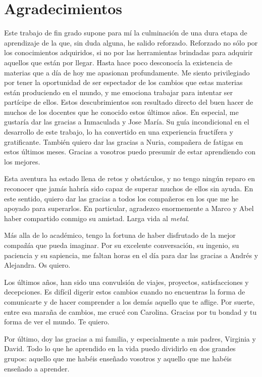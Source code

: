 
\chapter*{Agradecimientos}
Este trabajo de fin grado supone para mí la culminación de una dura etapa de aprendizaje de la que, sin duda alguna, he salido reforzado. Reforzado no sólo por los conocimientos adquiridos, si no por las herramientas brindadas para adquirir aquellos que están por llegar. Hasta hace poco desconocía la existencia de materias que a día de hoy me apasionan profundamente. Me siento privilegiado por tener la oportunidad de ser espectador de los cambios que estas materias están produciendo en el mundo, y me emociona trabajar para intentar ser partícipe de ellos. Estos descubrimientos son resultado directo del buen hacer de muchos de los docentes que he conocido estos últimos años. En especial, me gustaría dar las gracias a Inmaculada y Jose María. Su guía incondicional en el desarrollo de este trabajo, lo ha convertido en una experiencia fructífera y gratificante. También quiero dar las gracias a Nuria, compañera de fatigas en estos últimos meses. Gracias a vosotros puedo presumir de estar aprendiendo con los mejores.

Esta aventura ha estado llena de retos y obstáculos, y no tengo ningún reparo en reconocer que jamás habría sido capaz de superar muchos de ellos sin ayuda. En este sentido, quiero dar las gracias a todos los compañeros en los que me he apoyado para superarlos. En particular, agradezco enormemente a Marco y Abel haber compartido conmigo su amistad. Larga vida al \emph{metal}. 

Más alla de lo académico, tengo la fortuna de haber disfrutado de la mejor compañía que pueda imaginar. Por su excelente conversación, su ingenio, su paciencia y su sapiencia, me faltan horas en el día para dar las gracias a Andrés y Alejandra. Os quiero.

Los últimos años, han sido una convulsión de viajes, proyectos, satisfacciones y decepciones. Es difícil digerir estos cambios cuando no encuentras la forma de comunicarte y de hacer comprender a los demás aquello que te aflige. Por suerte, entre esa maraña de cambios, me crucé con Carolina. Gracias por tu bondad y tu forma de ver el mundo. Te quiero.

Por último, doy las gracias a mi familia, y especialmente a mis padres, Virginia y David. Todo lo que he aprendido en la vida puedo dividirlo en dos grandes grupos: aquello que me habéis enseñado vosotros y aquello que me habéis enseñado a aprender.